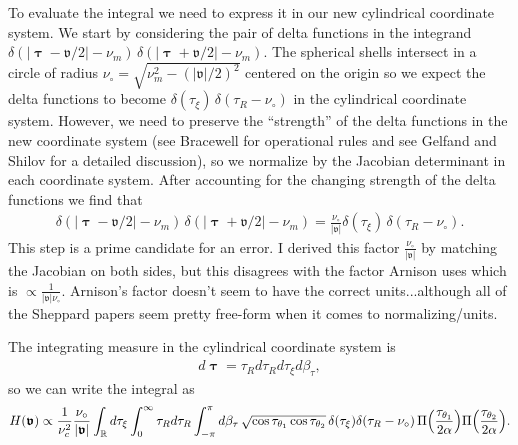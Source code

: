 \documentclass[]{osa-article}
\let\originalleft\left
\let\originalright\right
\renewcommand{\left}{\mathopen{}\mathclose\bgroup\originalleft}
\renewcommand{\right}{\aftergroup\egroup\originalright}
\providecommand{\mbb}[1]{\mathbb{#1}}
\providecommand{\bs}[1]{\boldsymbol{#1}}
\providecommand{\bv}{\boldsymbol{\mathfrak{v}}}
\providecommand{\bt}{\bs{\uptau}}
\providecommand{\add}[1]{{\color{blue}#1}}
\begin{document}
To evaluate the integral we need to express it in our new cylindrical coordinate system. We start by considering the pair of delta functions in the integrand $\delta(|\bt - \bv/2| - \nu_m)\,\delta(|\bt + \bv/2| - \nu_m)$. The spherical shells intersect in a circle of radius $\nu_\circ = \sqrt{\nu_m^2 - (|\bv|/2)^2}$ centered on the origin so we expect the delta functions to become $\delta(\tau_\xi)\,\delta(\tau_R - \nu_\circ)$ in the cylindrical coordinate system. However, we need to preserve the ``strength'' of the delta functions in the new coordinate system (see Bracewell \cite{bracewell2004} for operational rules and see Gelfand and Shilov \cite{gelfand2016} for a detailed discussion), so we normalize by the Jacobian determinant in each coordinate system. After accounting for the changing strength of the delta functions we find that
\begin{align}
  \delta(|\bt - \bv/2| - \nu_m)\,\delta(|\bt + \bv/2| - \nu_m) = \frac{\nu_\circ}{|\bv|}\delta(\tau_\xi)\,\delta(\tau_R - \nu_\circ).
\end{align}
\add{This step is a prime candidate for an error. I derived this factor
  $\frac{\nu_\circ}{|\bv|}$ by matching the Jacobian on both sides, but this
  disagrees with the factor Arnison \cite{arnison2002} uses which is $\propto \frac{1}{|\bv|\nu_\circ}$. Arnison's factor doesn't seem to have the correct units...although all of the Sheppard papers seem pretty free-form when it comes to normalizing/units.}

The integrating measure in the cylindrical coordinate system is
\begin{align}
  d\bt = \tau_R d\tau_R d\tau_\xi d\beta_\tau,
\end{align}
so we can write the integral as 
\begin{align}
  H(\bv) \propto \frac{1}{\nu_c^2}\frac{\nu_\circ}{|\bv|}\int_{\mbb{R}}d\tau_\xi\int_{0}^{\infty}\tau_Rd\tau_R\int_{-\pi}^{\pi}d\beta_\tau\, \sqrt{\cos\tau_{\theta_1}\cos\tau_{\theta_2}}\,\delta(\tau_\xi)\delta(\tau_R - \nu_\circ)\,\Pi\left(\frac{\tau_{\theta_1}}{2\alpha}\right)\Pi\left(\frac{\tau_{\theta_2}}{2\alpha}\right).
\end{align}
\end{document}
